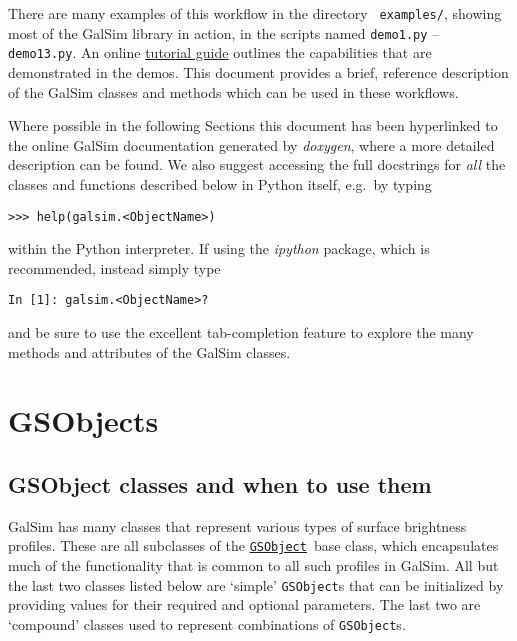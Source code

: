 \documentclass[preprint,10pt]{../../devel/modules/aastex}
\newcommand\GSObject{\href{http://galsim-developers.github.io/GalSim/classgalsim_1_1base_1_1_g_s_object.html}{\texttt{GSObject}}}
\begin{document}
There are many examples of this workflow in the directory {\tt
 examples/}, showing most of the GalSim library in action, in
the scripts named \texttt{demo1.py} -- \texttt{demo13.py}. An online
\href{https://github.com/GalSim-developers/GalSim/wiki/Tutorials}{tutorial guide} outlines the
capabilities that are demonstrated in the demos.   This
document provides a brief, reference description of the GalSim classes
and methods which can be used in these workflows.

Where possible in the following Sections this document has been hyperlinked to the online
GalSim documentation generated by \emph{doxygen}, where a more detailed
description can be found.  We also suggest accessing the full docstrings for \emph{all} the
classes and functions described below in Python itself, e.g.\ by typing

\texttt{>>> help(galsim.<ObjectName>)}

within the Python interpreter.  If using the \emph{ipython} package,
which is recommended, instead simply type

\texttt{In [1]: galsim.<ObjectName>?}

and be sure to use the excellent tab-completion feature to explore the many
methods and attributes of the GalSim classes.


\section{GSObjects}\label{sect:gsobjects}

\subsection{GSObject classes and when to use them}\label{sect:gsobjectclasses}
GalSim has many classes that represent various types of surface brightness profiles.
These are all subclasses of the \GSObject\ base class, which encapsulates
much of the functionality that is common to all such profiles in GalSim.
All but the last two classes listed below are
`simple' \texttt{GSObject}s that can be initialized by providing
values for their required and optional parameters.  The last two are
`compound' classes used to represent combinations of
\texttt{GSObject}s.
\end{document}
